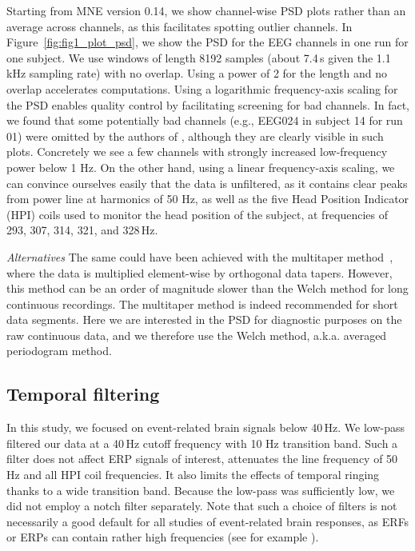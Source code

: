 Starting from MNE version 0.14, we show channel-wise PSD plots rather than an average across channels, as this facilitates spotting outlier channels. In Figure~\ref{fig:fig1_plot_psd}, we show the PSD for the EEG channels in one run for one subject. We use windows of length 8192 samples (about 7.4\,s given the 1.1\,kHz sampling rate) with no overlap. Using a power of 2 for the length and no overlap accelerates computations. Using a logarithmic frequency-axis scaling for the PSD enables quality control by facilitating screening for bad channels. In fact, we found that some potentially bad channels (e.g., EEG024 in subject 14 for run 01) were omitted by the authors of \citep{wakeman2015multi}, although they are clearly visible in such plots. Concretely we see a few channels with strongly increased low-frequency power below 1 Hz. On the other hand, using a linear frequency-axis scaling, we can convince ourselves easily that the data is unfiltered, as it contains clear peaks from power line at harmonics of 50 Hz, as well as the five Head Position Indicator (HPI) coils used to monitor the head position of the subject, at frequencies of 293, 307, 314, 321, and 328\,Hz.

\emph{Alternatives} The same could have been achieved with the multitaper method~\citep{percival1993spectral, slepian1978prolate}, where the data is multiplied element-wise by orthogonal data tapers. However, this method can be an order of magnitude slower than the Welch method for long continuous recordings. The multitaper method is indeed recommended for short data segments. Here we are interested in the PSD for diagnostic purposes on the raw continuous data, and we therefore use the Welch method, a.k.a. averaged periodogram method.

\subsection{Temporal filtering}
\label{sec:group_study_temporal_filtering}

In this study, we focused on event-related brain signals below 40\,Hz. We low-pass filtered our data at a 40\,Hz cutoff frequency with 10 Hz transition band. Such a filter does not affect \ac{ERP} signals of interest, attenuates the line frequency of 50\,Hz and all HPI coil frequencies. It also limits the effects of temporal ringing thanks to a wide transition band. Because the low-pass was sufficiently low, we did not employ a notch filter separately. Note that such a choice of filters is not necessarily a good default for all studies of event-related brain responses, as ERFs or ERPs can contain rather high frequencies (see for example \citep{gotz-etal:15}).

